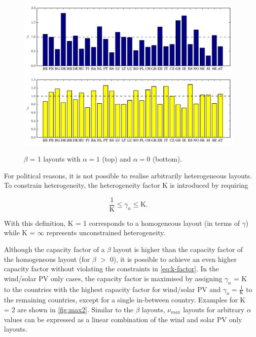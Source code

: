 \documentclass[a4paper, 12pt, sort&compress]{elsarticle}%
\newcommand{\chromowidth}{1.05 \columnwidth}
\begin{document}

\begin{figure}[h!]
  \centering
  \includegraphics[width = \chromowidth, center]{beta=1wind}
  \includegraphics[width = \chromowidth, center]{beta=1solar}
  \caption{$\beta$ = 1 layouts with $\alpha = 1$ (top) and $\alpha = 0$ (bottom).}
  \label{fig:beta1}
\end{figure}

For political reasons, it is not possible to realise arbitrarily
heterogeneous layouts. To constrain heterogeneity, the heterogeneity
factor K is introduced by requiring

\begin{equation}
  \label{eq:k-factor}
  \frac{1}{\text{K}} \leq \gamma_{n} \leq \text{K} .
\end{equation}

With this definition, K = 1 corresponds to a homogeneous layout (in
terms of $\gamma$) while K = $\infty$ represents unconstrained
heterogeneity.

Although the capacity factor of a $\beta$ layout is higher than the
capacity factor of the homogeneous layout (for $\beta$ $>$ 0), it is
possible to achieve an even higher capacity factor without violating
the constraints in \cref{eq:k-factor}. In the wind/solar PV only
cases, the capacity factor is maximised by assigning $\gamma_{n}$ = K to
the countries with the highest capacity factor for wind/solar PV and
$\gamma_{n} = \frac{1}{\text{K}}$ to the remaining countries, except for a
single in-between country. Examples for K = 2 are shown in
\cref{fig:max2}. Similar to the $\beta$ layouts, $\nu_{max}$ layouts for
arbitrary $\alpha$ values can be expressed as a linear combination of the
wind and solar PV only layouts.
\end{document}

